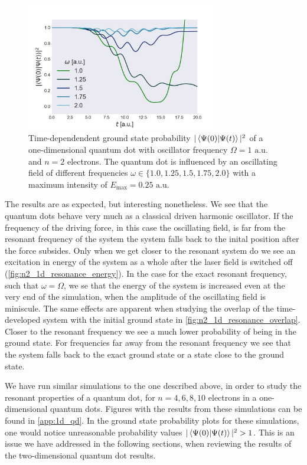 \begin{figure}
    \centering
    \includegraphics[width=0.75\textwidth]{results/figures/1D/n2_resonance_overlap.png} 
    \caption{Time-dependendent ground state probability $|\braket{\Psi(0)}{\Psi(t)}|^2$
        of a one-dimensional quantum dot with
        oscillator frequency $\Omega=1 \text{ a.u.}$ and $n=2$ electrons.
        The quantum dot is influenced by an oscillating field of different 
        frequencies $\omega\in\{1.0, 1.25, 1.5, 1.75, 2.0\}$ with a maximum 
        intensity of $E_\text{max} = 0.25\text{ a.u.}$
    }
    \label{fig:n2_1d_resonance_overlap}
\end{figure}

The results are as expected, but interesting nonetheless. We see that the quantum dots 
behave very much as a classical driven harmonic oscillator. If the frequency of the driving
force, in this case the oscillating field, is far from the resonant frequency of the 
system the system falls back to the inital position after the force subsides. Only when we 
get closer to the resonant system do we see an excitation in energy of the system as 
a whole after the laser field is switched off (\autoref{fig:n2_1d_resonance_energy}).
In the case for the exact resonant frequency,
such that $\omega=\Omega$, we se that the energy of the system is increased even at the very 
end of the simulation, when the amplitude of the oscillating field is miniscule.
The same effects are apparent when studying the overlap of the time-developed system 
with the initial ground state in \autoref{fig:n2_1d_resonance_overlap}. Closer to the
resonant frequency we see a much lower probability of being in the ground state. For 
frequencies far away from the resonant frequency we see that the system falls back to 
the exact ground state or a state close to the ground state.

We have run similar simulations to the one described above, in order to study the 
resonant properties of a quantum dot, for $n=4,6,8,10$ electrons in a one-dimensional 
quantum dots. Figures with the results from these simulations can be found in 
\autoref{app:1d_qd}. In the ground state probability plots for these simulations, 
one would notice unreasonable probability values $|\braket{\Psi(0)}{\Psi(t)}|^2 > 1$.
This is an issue we have addressed in the following sections, when reviewing the results 
of the two-dimensional quantum dot results.


